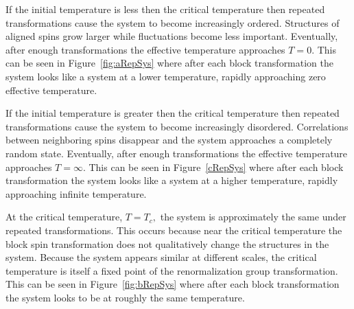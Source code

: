 If the initial temperature is less then the critical temperature then repeated transformations cause the system to become increasingly ordered. Structures of aligned spins grow larger while fluctuations become less important. Eventually, after enough transformations the effective temperature approaches \(T=0\). This can be seen in Figure~\ref{fig:aRepSys} where after each block transformation the system looks like a system at a lower temperature, rapidly approaching zero effective temperature. 

If the initial temperature is greater then the critical temperature then repeated transformations cause the  system to become increasingly disordered. Correlations between neighboring spins disappear and the system approaches a completely random state. Eventually, after enough transformations the effective temperature approaches \(T = \infty\). This can be seen in Figure~\ref{cRepSys} where after each block transformation the system looks like a system at a higher temperature, rapidly approaching infinite temperature. 

At the critical temperature, \(T = T_c,\) the system is approximately the same under repeated transformations. This occurs because near the critical temperature the block spin transformation does not qualitatively change the structures in the system. Because the system appears similar at different scales, the critical temperature is itself a fixed point of the renormalization group transformation. This can be seen in Figure~\ref{fig:bRepSys} where after each block transformation the system looks to be at roughly the same temperature. 